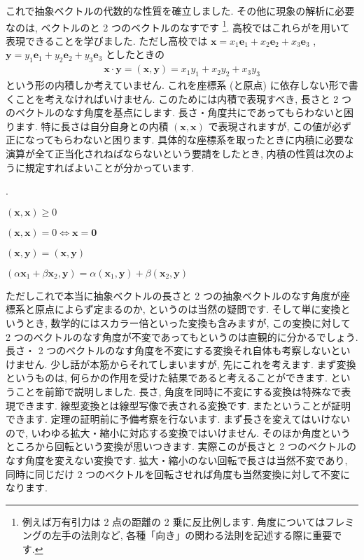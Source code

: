 \documentclass[openany, a4paper, oneside]{jsbook}
\newcounter{enum2}
\renewenvironment{enumerate}{%
\begin{list}%
{%
\arabic{enum2}.\ \,%
}%
{%
\usecounter{enum2}
\setlength{\itemindent}{0pt}%
\setlength{\leftmargin}{15pt}%
\setlength{\rightmargin}{0pt}%
\setlength{\labelsep}{0pt}%
\setlength{\labelwidth}{6pt}%
\setlength{\itemsep}{0pt}%
\setlength{\parsep}{0pt}%
\setlength{\listparindent}{0pt}%
}
}{%
\end{list}%
}
\theoremstyle{break}
\theoremstyle{breakdefn}
\begin{document}
これで抽象ベクトルの代数的な性質を確立しました.
その他に現象の解析に必要なのは, ベクトルのと 2 つのベクトルのなすです \footnote{例えば万有引力は 2 点の距離の 2 乗に反比例します.
角度についてはフレミングの左手の法則など, 各種「向き」の関わる法則を記述する際に重要です.
 }.
高校ではこれらがを用いて表現できることを学びました.
ただし高校では
 $\bm{x} = x_1 \bm{e}_1 + x_2 \bm{e}_2 + x_3 \bm{e}_3$ ,
 $\bm{y} = y_1 \bm{e}_1 + y_2 \bm{e}_2 + y_3 \bm{e}_3$
としたときの
    \begin{align}
        \bm{x} \cdot \bm{y}
        = ( \bm{x} , \bm{y} )
        = x_1 y_1 + x_2 y_2 + x_3 y_3
    \end{align}
という形の内積しか考えていません.
これを座標系 (と原点) に依存しない形で書くことを考えなければいけません.
このためには内積で表現すべき, 長さと 2 つのベクトルのなす角度を基点にします.
長さ・角度共にであってもらわないと困ります.
特に長さは自分自身との内積 $(\bm{x},\bm{x})$ で表現されますが, この値が必ず正になってもらわないと困ります.
具体的な座標系を取ったときに内積に必要な演算が全て正当化されねばならないという要請をしたとき,
内積の性質は次のように規定すればよいことが分かっています.
    \begin{enumerate}
        \item[1)] $( \bm{x} , \bm{x} ) \geq 0$
        \item[2)] $( \bm{x} , \bm{x} ) = 0 \Longleftrightarrow \bm{x} = \bm{0}$
        \item[3)] $( \bm{x} , \bm{y} ) = ( \bm{x} , \bm{y})$
        \item[4)] $(\alpha \bm{x}_1 + \beta \bm{x}_2 , \bm{y} ) = \alpha ( \bm{x}_1 , \bm{y} ) + \beta ( \bm{x}_2 , \bm{y} )$
    \end{enumerate}
ただしこれで本当に抽象ベクトルの長さと 2 つの抽象ベクトルのなす角度が座標系と原点によらず定まるのか, というのは当然の疑問です.
そして単に変換というとき, 数学的にはスカラー倍といった変換も含みますが,
この変換に対して 2 つのベクトルのなす角度が不変であってもというのは直観的に分かるでしょう.
長さ・ 2 つのベクトルのなす角度を不変にする変換それ自体も考察しないといけません.
少し話が本筋からそれてしまいますが, 先にこれを考えます.
まず変換というものは, 何らかの作用を受けた結果であると考えることができます.
ということを前節で説明しました.
長さ, 角度を同時に不変にする変換は特殊なで表現できます.
線型変換とは線型写像で表される変換です.
またということが証明できます.
定理の証明前に予備考察を行ないます.
まず長さを変えてはいけないので, いわゆる拡大・縮小に対応する変換ではいけません.
そのほか角度というところから回転という変換が思いつきます.
実際このが長さと 2 つのベクトルのなす角度を変えない変換です.
拡大・縮小のない回転で長さは当然不変であり,
同時に同じだけ 2 つのベクトルを回転させれば角度も当然変換に対して不変になります.
\end{document}
